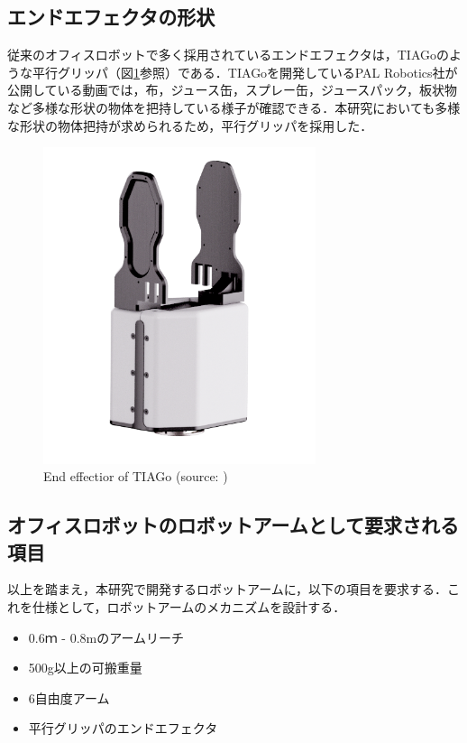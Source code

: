 \subsection{エンドエフェクタの形状}
従来のオフィスロボットで多く採用されているエンドエフェクタは，TIAGoのような平行グリッパ（図\ref{fig:tiago_hand}参照）である．TIAGoを開発しているPAL Robotics社が公開している動画\cite{TIAGo-movie:online}では，布，ジュース缶，スプレー缶，ジュースパック，板状物など多様な形状の物体を把持している様子が確認できる．本研究においても多様な形状の物体把持が求められるため，平行グリッパを採用した．
\begin{figure}[h]
  \centering
  \includegraphics[width=8cm]{images/2syou/tiago_hand.png}
  \caption[End effectior of TIAGo]{End effectior of TIAGo (source: \cite{TIAGo:online})}
  \label{fig:tiago_hand}
\end{figure}
\clearpage

\subsection{オフィスロボットのロボットアームとして要求される項目}
以上を踏まえ，本研究で開発するロボットアームに，以下の項目を要求する．これを仕様として，ロボットアームのメカニズムを設計する．
\begin{itemize}
  \item 0.6ｍ - 0.8mのアームリーチ
  \item 500g以上の可搬重量
  \item 6自由度アーム
  \item 平行グリッパのエンドエフェクタ
\end{itemize}
\newpage